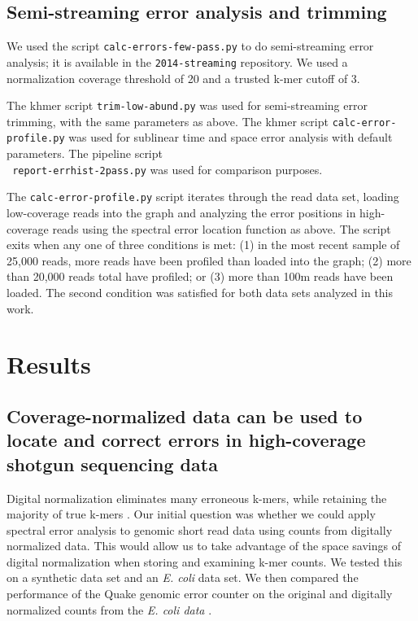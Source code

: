 \documentclass{article}
\begin{document}
\subsection{Semi-streaming error analysis and trimming}

We used the script {\tt calc-errors-few-pass.py} to do semi-streaming
error analysis; it is available in the {\tt 2014-streaming}
repository.  We used a normalization coverage threshold of 20 and a trusted
k-mer cutoff of 3.

The khmer script {\tt trim-low-abund.py} was used for semi-streaming
error trimming, with the same parameters as above.  The khmer script
{\tt calc-error-profile.py} was used for sublinear time and space
error analysis with default parameters.  The pipeline script \\{\tt
  report-errhist-2pass.py} was used for comparison purposes.

The {\tt calc-error-profile.py} script iterates through the read data
set, loading low-coverage reads into the graph and analyzing the error
positions in high-coverage reads using the spectral error location
function as above.  The script exits when any one of three conditions
is met: (1) in the most recent sample of 25,000 reads, more reads have
been profiled than loaded into the graph; (2) more than 20,000 reads
total have profiled; or (3) more than 100m reads have been loaded.
The second condition was satisfied for both data sets analyzed in this
work.

\section{Results}

\subsection{Coverage-normalized data can be used to locate
and correct errors in high-coverage shotgun sequencing data}

Digital normalization eliminates many erroneous k-mers, while
retaining the majority of true k-mers \cite{Brown2012}.  Our initial
question was whether we could apply spectral error analysis to genomic
short read data using counts from digitally normalized data. This
would allow us to take advantage of the space savings of digital
normalization when storing and examining k-mer counts.  We tested this
on a synthetic data set and an {\em E. coli} data set.  We then
compared the performance of the Quake genomic error counter on the
original and digitally normalized counts from the {\em E. coli data}
\cite{quake}.
\end{document}
